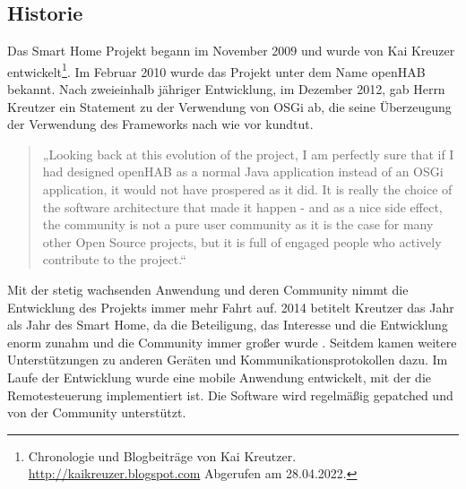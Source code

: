     \subsection*{Historie}
    \label{sec:historyoHAB}
    Das Smart Home Projekt begann im November 2009 und wurde von Kai Kreuzer entwickelt\footnote{Chronologie und Blogbeiträge von Kai Kreutzer. \url{http://kaikreuzer.blogspot.com} Abgerufen am 28.04.2022.}. 
    Im Februar 2010 wurde das Projekt unter dem Name openHAB bekannt. Nach zweieinhalb jähriger Entwicklung, im Dezember 2012, 
    gab Herrn Kreutzer ein Statement zu der Verwendung von OSGi ab, die seine Überzeugung der Verwendung des Frameworks nach wie 
    vor kundtut.
    \begin{quote}
        „Looking back at this evolution of the project, I am perfectly sure that if I had designed openHAB as a normal Java 
        application instead of an OSGi application, it would not have prospered as it did. It is really the choice of the 
        software architecture that made it happen - and as a nice side effect, the community is not a pure user community 
        as it is the case for many other Open Source projects, but it is full of engaged people who actively contribute to the 
        project.\cite{kaikreutzer2012}“
    \end{quote} 
    Mit der stetig wachsenden Anwendung und deren Community nimmt die Entwicklung des Projekts immer mehr Fahrt auf. 2014 betitelt 
    Kreutzer das Jahr als Jahr des Smart Home, da die Beteiligung, das Interesse und die Entwicklung enorm zunahm und die Community immer 
    großer wurde \cite{kaikreutzer2014}. Seitdem kamen weitere Unterstützungen zu anderen Geräten und 
    Kommunikationsprotokollen dazu. Im Laufe der Entwicklung wurde eine mobile Anwendung entwickelt, mit der die Remotesteuerung 
    implementiert ist. Die Software wird regelmäßig gepatched und von der Community unterstützt.

